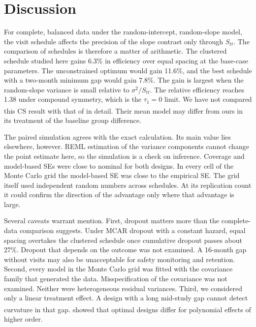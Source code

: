 \documentclass[
  11pt,
]{article}
\begin{document}
\section{Discussion}\label{discussion}

For complete, balanced data under the random-intercept,
random-slope model, the visit schedule affects the precision of
the slope contrast only through \(S_{tt}\). The comparison of
schedules is therefore a matter of arithmetic. The clustered
schedule studied here gains
6.3\% in efficiency over
equal spacing at the base-case parameters. The unconstrained
optimum would gain
11.6\%, and the
best schedule with a two-month minimum gap would gain
7.8\%. The gain is
largest when the random-slope variance is small relative to
\(\sigma^2 / S_{tt}\). The relative efficiency reaches
1.38 under compound symmetry,
which is the \(\tau_1 = 0\) limit. We have not compared this CS
result with that of\textsuperscript{} in
detail. Their mean model
may differ from ours in its treatment of the baseline group
difference.

The paired simulation agrees with the exact calculation. Its
main value lies elsewhere, however. REML estimation of the
variance components cannot change the point estimate here, so the
simulation is a check on inference. Coverage and model-based SEs
were close to nominal for both designs. In every cell of the Monte
Carlo grid the model-based SE was close to the empirical SE. The
grid itself used independent random numbers
across schedules. At its replication count it could confirm the
direction of the advantage only where that advantage is large.

Several caveats warrant mention. First, dropout matters more than
the complete-data comparison suggests. Under MCAR dropout with a
constant hazard, equal spacing overtakes the clustered schedule
once cumulative dropout passes about
27\%. Dropout that depends on the
outcome was not examined. A 16-month gap without visits may also
be unacceptable for safety monitoring and retention. Second, every
model in the Monte Carlo grid was fitted with the covariance
family that generated the data. Misspecification of the covariance
was not examined. Neither were heterogeneous residual variances.
Third, we considered only a linear treatment effect. A design with
a long mid-study gap cannot detect curvature in that gap.\textsuperscript{} showed that optimal designs differ for
polynomial effects of higher order.
\end{document}
